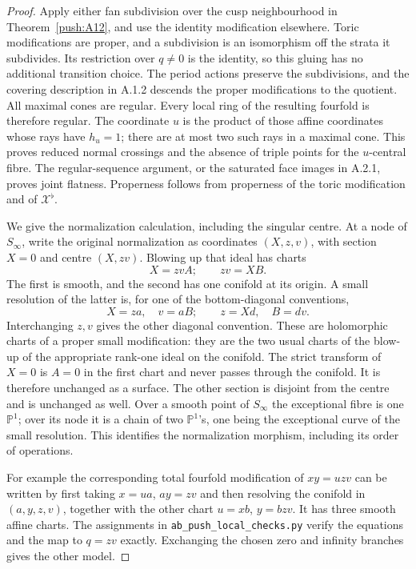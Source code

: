 \begin{proof}
Apply either fan subdivision over the cusp neighbourhood in
Theorem~\ref{push:A12}, and use the identity modification elsewhere.
Toric modifications are proper, and a subdivision is an
isomorphism off the strata it subdivides. Its restriction over
$q\ne0$ is the identity, so this gluing has no additional
transition choice. The period actions preserve the subdivisions,
and the covering description in A.1.2 descends the proper
modifications to the quotient. All maximal cones are regular.
Every local ring of the resulting fourfold is therefore regular.
The coordinate $u$ is the product of those affine coordinates
whose rays have $h_u=1$; there are at most two such rays in a
maximal cone. This proves reduced normal crossings and the absence
of triple points for the $u$-central fibre. The regular-sequence
argument, or the saturated face images in A.2.1, proves joint
flatness. Properness follows from properness of the toric
modification and of $\mathcal X^\flat$.

We give the normalization calculation, including the singular
centre. At a node of $S_\infty$, write the original normalization
as coordinates $(X,z,v)$, with section $X=0$ and centre
$(X,zv)$. Blowing up that ideal has charts
\[
 X=zvA;\qquad zv=XB.
\]
The first is smooth, and the second has one conifold at its
origin. A small resolution of the latter is, for one of the
bottom-diagonal conventions,
\[
 X=za,\quad v=aB;\qquad z=Xd,\quad B=dv.
\]
Interchanging $z,v$ gives the other diagonal convention. These
are holomorphic charts of a proper small modification: they are
the two usual charts of the blow-up of the appropriate rank-one
ideal on the conifold. The strict transform of $X=0$ is $A=0$
in the first chart and never passes through the conifold. It is
therefore unchanged as a surface. The other section is disjoint
from the centre and is unchanged as well. Over a smooth point
of $S_\infty$ the exceptional fibre is one $\mathbb P^1$;
over its node it is a chain of two $\mathbb P^1$'s, one being
the exceptional curve of the small resolution. This identifies
the normalization morphism, including its order of operations.

For example the corresponding total fourfold modification of
$xy=uzv$ can be written by first taking $x=ua$, $ay=zv$ and
then resolving the conifold in $(a,y,z,v)$, together with the
other chart $u=xb$, $y=bzv$. It has three smooth affine charts.
The assignments in \texttt{ab\_push\_local\_checks.py} verify
the equations and the map to $q=zv$ exactly. Exchanging the
chosen zero and infinity branches gives the other model.


\end{proof}
